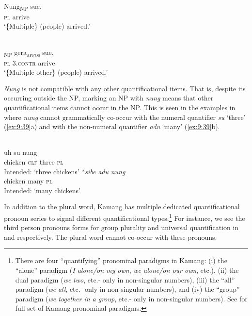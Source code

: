 \ea%
\label{ex:9:37}
 \\
\gll  {\ob}Nung{\cb}\textsubscript{\upshape NP} sue. \\
   \textsc{pl} arrive  \\
\glt `\{Multiple\} (people) arrived.'
\z







\ea%
\label{ex:9:38}
 \\
\textsubscript{\upshape \textsc{NP}} {gera}\textsubscript{\upshape \textsc{appos}} sue. \\
   \textsc{pl} \textsc{3.contr} arrive  \\
\glt `\{Multiple other\} (people) arrived.'
\z






\textit{Nung} is not compatible with any other quantificational items. That is, despite its occurring outside the NP, marking an NP with \textit{nung} means that other quantificational items cannot occur in the NP. This is seen in the examples in  where \textit{nung} cannot grammatically co-occur with the numeral quantifier \textit{su} `three' (\ref{ex:9:39}a) and with the non-numeral quantifier \textit{adu} `many' (\ref{ex:9:39}b).

\newpage
\ea%
\label{ex:9:39}
 \\
\ea
{} uh su {nung}\\
   chicken \textsc{clf} three \textsc{pl} \\
\glt Intended: `three chickens'
\ex
\gll
*\textit{sibe} \textit{adu} \textit{nung}\\
    chicken many   \textsc{pl}\\
\glt  Intended: `many chickens'
 \z
 \z




In addition to the plural word, Kamang has multiple dedicated quantificational pronoun series to signal different quantificational types.\footnote{There are four ``quantifying'' pronominal paradigms in Kamang: (i) the ``alone'' paradigm (\textit{I alone/on my own}, \textit{we alone/on our own}, etc.), (ii) the dual paradigm (\textit{we} \textit{two}, etc.- only in non-singular numbers), (iii) the ``all'' paradigm (\textit{we} \textit{all}, etc.- only in non-singular numbers), and (iv) the ``group'' paradigm (\textit{we together in a group}, etc.- only in non-singular numbers). See \citet{Schapperta} for full set of Kamang pronominal paradigms.} For instance, we see the third person pronouns forms for group plurality and universal quantification in  and  respectively. The plural word cannot co-occur with these pronouns.


